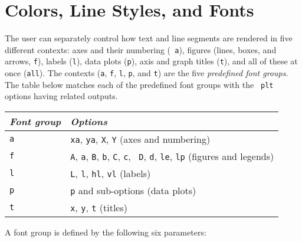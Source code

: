 \documentclass{book}
\begin{document}
\chapter{Colors, Line Styles, and Fonts \label{sec:font-groups}}

%
%
The user can separately control how text and line segments are
rendered in five different contexts: axes and their numbering ({\tt
a}), figures (lines, boxes, and arrows, {\tt f}), labels ({\tt l}),
data plots ({\tt p}), axis and graph titles ({\tt t}), and all of
these at once ({\tt all}).  The contexts ({\tt a}, {\tt f}, {\tt l},
{\tt p}, and {\tt t}) are the five {\em predefined font groups}.  The
table below matches each of the predefined font groups with the {\tt
plt} options having related outputs.

\begin{center}
\begin{tabular}{ll}
\emph{Font group} & \emph{Options} \\ \hline
{\tt a} & {\tt xa}, {\tt ya}, {\tt X}, {\tt Y} (axes and numbering) \\
{\tt f} & {\tt A}, {\tt a}, {\tt B}, {\tt b}, {\tt C}, {\tt c}, {\tt
D}, {\tt d}, {\tt le}, {\tt lp} (figures and legends) \\
{\tt l} & {\tt L}, {\tt l}, {\tt hl}, {\tt vl} (labels) \\
{\tt p} & {\tt p} and sub-options (data plots) \\
{\tt t} & {\tt x}, {\tt y}, {\tt t} (titles)
\end{tabular}
\end{center}

A font group is defined by the following six parameters:
\end{document}

